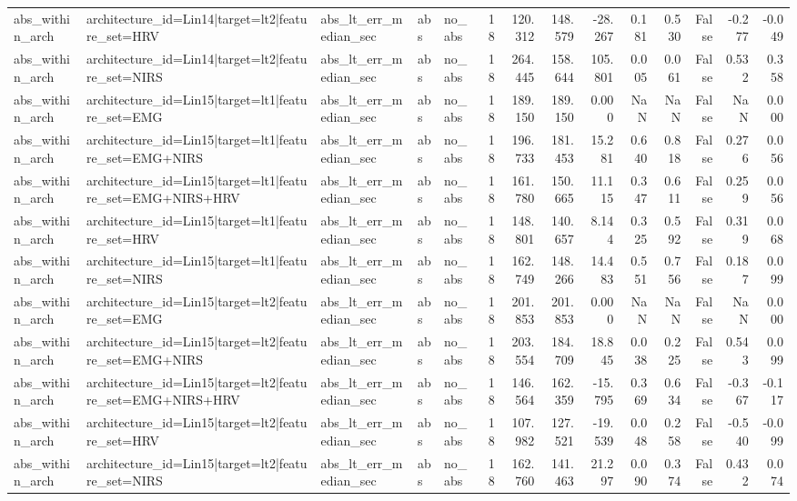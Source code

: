 \begin{table}
\begin{tabular}{lllllrrrrrrrrr}
abs_within_arch & architecture_id=Lin14|target=lt2|feature_set=HRV & abs_lt_err_median_sec & abs & no_abs & 18 & 120.312 & 148.579 & -28.267 & 0.181 & 0.530 & False & -0.277 & -0.049 \\
abs_within_arch & architecture_id=Lin14|target=lt2|feature_set=NIRS & abs_lt_err_median_sec & abs & no_abs & 18 & 264.445 & 158.644 & 105.801 & 0.005 & 0.061 & False & 0.532 & 0.358 \\
abs_within_arch & architecture_id=Lin15|target=lt1|feature_set=EMG & abs_lt_err_median_sec & abs & no_abs & 18 & 189.150 & 189.150 & 0.000 & NaN & NaN & False & NaN & 0.000 \\
abs_within_arch & architecture_id=Lin15|target=lt1|feature_set=EMG+NIRS & abs_lt_err_median_sec & abs & no_abs & 18 & 196.733 & 181.453 & 15.281 & 0.640 & 0.818 & False & 0.276 & 0.056 \\
abs_within_arch & architecture_id=Lin15|target=lt1|feature_set=EMG+NIRS+HRV & abs_lt_err_median_sec & abs & no_abs & 18 & 161.780 & 150.665 & 11.115 & 0.347 & 0.611 & False & 0.259 & 0.056 \\
abs_within_arch & architecture_id=Lin15|target=lt1|feature_set=HRV & abs_lt_err_median_sec & abs & no_abs & 18 & 148.801 & 140.657 & 8.144 & 0.325 & 0.592 & False & 0.319 & 0.068 \\
abs_within_arch & architecture_id=Lin15|target=lt1|feature_set=NIRS & abs_lt_err_median_sec & abs & no_abs & 18 & 162.749 & 148.266 & 14.483 & 0.551 & 0.756 & False & 0.187 & 0.099 \\
abs_within_arch & architecture_id=Lin15|target=lt2|feature_set=EMG & abs_lt_err_median_sec & abs & no_abs & 18 & 201.853 & 201.853 & 0.000 & NaN & NaN & False & NaN & 0.000 \\
abs_within_arch & architecture_id=Lin15|target=lt2|feature_set=EMG+NIRS & abs_lt_err_median_sec & abs & no_abs & 18 & 203.554 & 184.709 & 18.845 & 0.038 & 0.225 & False & 0.543 & 0.099 \\
abs_within_arch & architecture_id=Lin15|target=lt2|feature_set=EMG+NIRS+HRV & abs_lt_err_median_sec & abs & no_abs & 18 & 146.564 & 162.359 & -15.795 & 0.369 & 0.634 & False & -0.367 & -0.117 \\
abs_within_arch & architecture_id=Lin15|target=lt2|feature_set=HRV & abs_lt_err_median_sec & abs & no_abs & 18 & 107.982 & 127.521 & -19.539 & 0.048 & 0.258 & False & -0.540 & -0.099 \\
abs_within_arch & architecture_id=Lin15|target=lt2|feature_set=NIRS & abs_lt_err_median_sec & abs & no_abs & 18 & 162.760 & 141.463 & 21.297 & 0.090 & 0.374 & False & 0.432 & 0.074 \\

\end{tabular}
\end{table}
